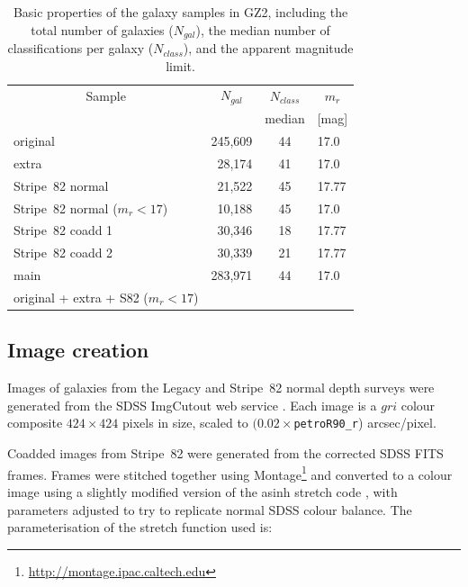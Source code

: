 \documentclass[useAMS,usenatbib]{mn2e}
\begin{document}
\begin{table}
 \begin{tabular}{@{}lrcl}
 \hline
\multicolumn{1}{c}{Sample} &
\multicolumn{1}{c}{$N_{gal}$} &
\multicolumn{1}{c}{$N_{class}$} &
\multicolumn{1}{c}{$m_r$} 
\\ 
\multicolumn{1}{c}{} &
\multicolumn{1}{c}{} &
\multicolumn{1}{c}{median} &
\multicolumn{1}{c}{[mag]} 
\\ 
\hline
\hline						
original                       & 245,609 & 44  & 17.0   \\     %
extra                          &  28,174 & 41  & 17.0   \\     %
Stripe~82 normal               &  21,522 & 45  & 17.77  \\     %
Stripe~82 normal ($m_r<17$)    &  10,188 & 45  & 17.0   \\     %
Stripe~82 coadd 1              &  30,346 & 18  & 17.77  \\     %
Stripe~82 coadd 2              &  30,339 & 21  & 17.77  \\     %
\hline
main                           & 283,971 & 44  & 17.0   \\     %
original + extra + S82 ($m_r<17$) & \\
\hline
 \end{tabular}
 \caption{Basic properties of the galaxy samples in GZ2, including the total number of galaxies ($N_{gal}$), the median number of classifications per galaxy ($N_{class}$), and the apparent magnitude limit. \label{tbl-sample}}
\end{table}

\subsection{Image creation}\label{ssec-imagecreation}

Images of galaxies from the Legacy and Stripe~82 normal depth surveys were generated from the SDSS ImgCutout web service \citep{nie04}. Each image is a $gri$ colour composite $424\times424$ pixels in size, scaled to $(0.02\times${\tt petroR90\_r}) arcsec/pixel.

Coadded images from Stripe~82 were generated from the corrected SDSS FITS frames. Frames were stitched together using Montage\footnote{\url{http://montage.ipac.caltech.edu}} and converted to a colour image using a slightly modified version of the asinh stretch code \citep{lup04}, with parameters adjusted to try to replicate normal SDSS colour balance. The parameterisation of the stretch function used is:
\end{document}
